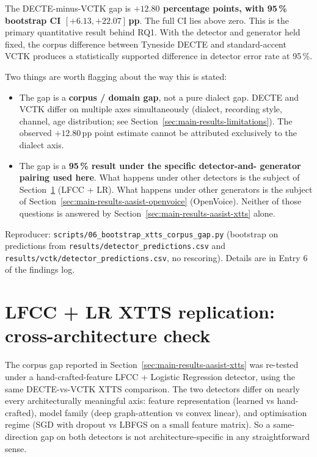 The DECTE-minus-VCTK gap is \textbf{$+12.80$ percentage points,
with 95\,\% bootstrap CI $[+6.13, +22.07]$\,pp}. The full CI lies
above zero. This is the primary quantitative result behind RQ1.
With the detector and generator held fixed, the corpus difference
between Tyneside DECTE and standard-accent VCTK produces a
statistically supported difference in detector error rate at 95\,\%.

Two things are worth flagging about the way this is stated:

\begin{itemize}
    \item The gap is a \textbf{corpus / domain gap}, not a pure dialect gap.
        DECTE and VCTK differ on multiple axes simultaneously (dialect,
        recording style, channel, age distribution; see Section~\ref{sec:main-results-limitations}).
        The observed $+12.80$\,pp point estimate cannot be attributed
        exclusively to the dialect axis.
    \item The gap is a \textbf{95\,\% result under the specific detector-and-%
        generator pairing used here}. What happens under other detectors
        is the subject of Section~\ref{sec:main-results-lfcc-xtts} (LFCC + LR). What happens under
        other generators is the subject of Section~\ref{sec:main-results-aasist-openvoice} (OpenVoice).
        Neither of those questions is answered by Section~\ref{sec:main-results-aasist-xtts} alone.
\end{itemize}

Reproducer: \texttt{scripts/06\_bootstrap\_xtts\_corpus\_gap.py} (bootstrap on
predictions from \texttt{results/detector\_predictions.csv} and
\texttt{results/vctk/detector\_predictions.csv}, no rescoring). Details are
in Entry 6 of the findings log.


\section{LFCC + LR XTTS replication: cross-architecture check}
\label{sec:main-results-lfcc-xtts}

The corpus gap reported in Section~\ref{sec:main-results-aasist-xtts}
was re-tested under a hand-crafted-feature LFCC + Logistic
Regression detector, using the same DECTE-vs-VCTK XTTS comparison.
The two detectors differ on nearly every architecturally
meaningful axis: feature representation (learned vs hand-crafted),
model family (deep graph-attention vs convex linear), and
optimisation regime (SGD with dropout vs LBFGS on a small feature
matrix). So a same-direction gap on both detectors is not
architecture-specific in any straightforward sense.

